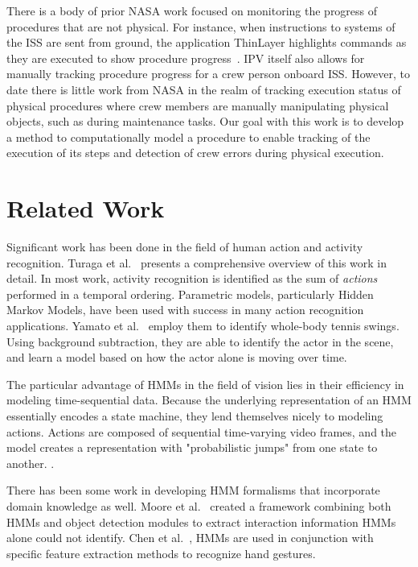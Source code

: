 \documentclass[10pt,twocolumn,letterpaper]{article}
\begin{document}
There is a body of prior NASA work focused on monitoring the progress of procedures that are not physical. For instance, when instructions to systems of the ISS are sent from ground, the application ThinLayer highlights commands as they are executed to show procedure progress~\cite{frank2010plans}. IPV itself also allows for manually tracking procedure progress for a crew person onboard ISS. However, to date there is little work from NASA in the realm of tracking execution status of physical procedures where crew members are manually manipulating physical objects, such as during maintenance tasks. Our goal with this work is to develop a method to computationally model a procedure to enable tracking of the execution of its steps and detection of crew errors during physical execution.


\section{Related Work}

Significant work has been done in the field of human action and activity recognition. Turaga et al.~\cite{turaga2008machine} presents a comprehensive overview of this work in detail. In most work, activity recognition is identified as the sum of \emph{actions} performed in a temporal ordering. Parametric models, particularly Hidden Markov Models, have been used with success in many action recognition applications. Yamato et al.~\cite{yamato1992recognizing} employ them to identify whole-body tennis swings. Using background subtraction, they are able to identify the actor in the scene, and learn a model based on how the actor alone is moving over time.

The particular advantage of HMMs in the field of vision lies in their efficiency in modeling time-sequential data. Because the underlying representation of an HMM essentially encodes a state machine, they lend themselves nicely to modeling actions. Actions are composed of sequential time-varying video frames, and the model creates a representation with "probabilistic jumps" from one state to another. \cite{turaga2008machine}.

There has been some work in developing HMM formalisms that incorporate domain knowledge as well. Moore et al.~\cite{moore1999exploiting} created a framework combining both HMMs and object detection modules to extract interaction information HMMs alone could not identify. Chen et al.~\cite{chen2003hand}, HMMs are used in conjunction with specific feature extraction methods to recognize hand gestures.
\end{document}
